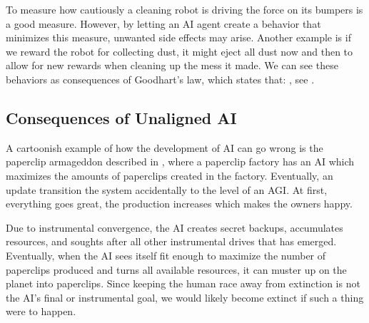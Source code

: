 \documentclass[12pt,A4]{report}
\theoremstyle{definition}
\begin{document}
To measure how cautiously a cleaning robot is driving the force on its bumpers is a good measure. However, by letting an AI agent create a behavior that minimizes this measure, unwanted side effects may arise. Another example is if we reward the robot for collecting dust, it might eject all dust now and then to allow for new rewards when cleaning up the mess it made. We can see these behaviors as consequences of Goodhart's law, which states that: , see \citet{wikiGoodhart}. %


\subsection{Consequences of Unaligned AI}
A cartoonish example of how the development of AI can go wrong is the paperclip armageddon described in \citet{Bostrom14}, where a paperclip factory has an AI which maximizes the amounts of paperclips created in the factory. Eventually, an update transition the system accidentally to the level of an AGI. At first, everything goes great, the production increases which makes the owners happy. 

Due to instrumental convergence, the AI creates secret backups, accumulates resources, and soughts after all other instrumental drives that has emerged. Eventually, when the AI sees itself fit enough to maximize the number of paperclips produced and turns all available resources, it can muster up on the planet into paperclips. Since keeping the human race away from extinction is not the AI's final or instrumental goal, we would likely become extinct if such a thing were to happen.
\end{document}
